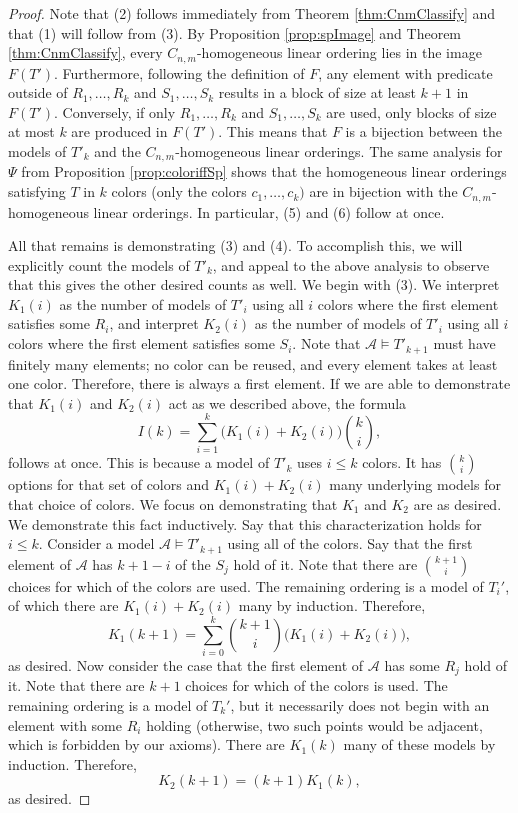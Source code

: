 \documentclass[11pt]{amsart}
\theoremstyle{definition}
\def\A{\mathcal A}
\begin{document}
\begin{proof}
    Note that (2) follows immediately from Theorem \ref{thm:CnmClassify} and that (1) will follow from (3).
    By Proposition \ref{prop:spImage} and Theorem \ref{thm:CnmClassify}, every $C_{n,m}$-homogeneous linear ordering lies in the image $F(T')$.
    Furthermore, following the definition of $F$, any element with predicate outside of $R_1,\dots,R_k$ and $S_1,\dots,S_k$ results in a block of size at least $k+1$ in $F(T')$.
    Conversely, if only $R_1,\dots,R_k$ and $S_1,\dots,S_k$ are used, only blocks of size at most $k$ are produced in $F(T')$.
    This means that $F$ is a bijection between the models of $T'_k$ and the $C_{n,m}$-homogeneous linear orderings.
    The same analysis for $\Psi$ from Proposition \ref{prop:coloriffSp} shows that the homogeneous linear orderings satisfying $T$ in $k$ colors (only the colors $c_1,\dots,c_k)$ are in bijection with the $C_{n,m}$-homogeneous linear orderings.
    In particular, (5) and (6) follow at once.

    All that remains is demonstrating (3) and (4).
    To accomplish this, we will explicitly count the models of $T'_k$, and appeal to the above analysis to observe that this gives the other desired counts as well.
    We begin with (3).
    We interpret $K_1(i)$ as the number of models of $T'_i$ using all $i$ colors where the first element satisfies some $R_i$, and interpret $K_2(i)$ as the number of models of $T'_i$ using all $i$ colors where the first element satisfies some $S_i$.
    Note that $\A\models T'_{k+1}$ must have finitely many elements; no color can be reused, and every element takes at least one color.
    Therefore, there is always a first element.
    If we are able to demonstrate that $K_1(i)$ and $K_2(i)$ act as we described above, the formula
    \[I(k)=\sum_{i=1}^{k} \big(K_1(i)+K_2(i)\big) {k \choose i},\]
    follows at once.
    This is because a model of $T'_k$ uses $i\leq k$ colors.
    It has ${k \choose i}$ options for that set of colors and $K_1(i)+K_2(i)$ many underlying models for that choice of colors.
    We focus on demonstrating that $K_1$ and $K_2$ are as desired.
    We demonstrate this fact inductively.
    Say that this characterization holds for $i\leq k$.
    Consider a model $\A\models T'_{k+1}$ using all of the colors.
    Say that the first element of $\A$ has $k+1-i$ of the $S_j$ hold of it.
    Note that there are ${k+1 \choose i}$ choices for which of the colors are used.
    The remaining ordering is a model of $T_i'$, of which there are $K_1(i)+K_2(i)$ many by induction.
    Therefore,
    \[K_1(k+1)= \sum_{i=0}^{k} {k+1 \choose i} \big(K_1(i)+K_2(i)\big),\]
    as desired.
    Now consider the case that the first element of $\A$ has some $R_j$ hold of it.
    Note that there are $k+1$ choices for which of the colors is used.
    The remaining ordering is a model of $T_k'$, but it necessarily does not begin with an element with some $R_i$ holding (otherwise, two such points would be adjacent, which is forbidden by our axioms).
    There are $K_1(k)$ many of these models by induction.
    Therefore,
    \[K_2(k+1)=(k+1)K_1(k),\]
    as desired.


\end{proof}
\end{document}
